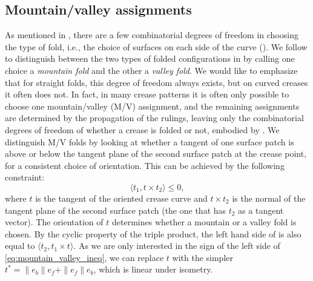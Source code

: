 \subsection{Mountain/valley assignments} 
As mentioned in , there are a few combinatorial degrees of freedom in choosing the type of fold, i.e., the choice of surfaces on each side of the curve (). We follow \cite{demaine_lens} to distinguish between the two types of folded configurations in  by calling one choice a \emph{mountain fold} and the other a \emph{valley fold}. We would like to emphasize that for straight folds, this degree of freedom always exists, but on curved creases it often does not. In fact, in many crease patterns it is often only possible to choose one mountain/valley (M/V) assignment, and the remaining assignments are determined by the propagation of the rulings, leaving only the combinatorial degrees of freedom of whether a crease is folded or not, embodied by . 
 We distinguish M/V folds by looking at whether a tangent of one surface patch is above or below the tangent plane of the second surface patch at the crease point, for a consistent choice of orientation. This can be achieved by the following constraint:
\begin{equation} \label{eq:mountain_valley_ineq}
\langle t_1, t \times t_2 \rangle \leq 0,
\end{equation}
where $t$ is the tangent of the oriented crease curve and $t \times t_2$ is the normal of the tangent plane of the second surface patch (the one that has $t_2$ as a tangent vector). The orientation of $t$ determines whether a mountain or a valley fold is chosen. By the cyclic property of the triple product, the left hand side of  is also equal to $\langle t_2, t_1 \times t \rangle$.
As we are only interested in the sign of the left side of \eqref{eq:mountain_valley_ineq}, we can replace $t$ with the simpler $t^* = \|e_b\|e_f + \|e_f\|e_b$, which is linear under isometry.
 
